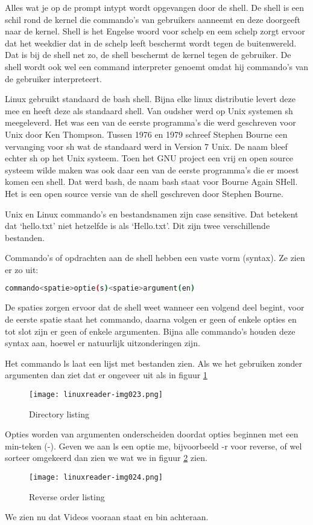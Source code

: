 Alles wat je op de prompt intypt wordt opgevangen door de shell. De shell is een schil rond de kernel die commando's van
gebruikers aanneemt en deze doorgeeft naar de kernel. Shell is het Engelse woord voor schelp en eem schelp zorgt ervoor
dat het weekdier dat in de schelp leeft beschermt wordt tegen de buitenwereld. Dat is bij de shell net zo, de shell
beschermt de kernel tegen de gebruiker. De shell wordt ook wel een command interpreter genoemt omdat hij commando's van
de gebruiker interpreteert.

Linux gebruikt standaard de bash shell. Bijna elke linux distributie levert deze mee en heeft deze als standaard shell.
Van oudsher werd op Unix systemen sh meegeleverd. Het was een van de eerste programma's die werd geschreven voor Unix
door Ken Thompson. Tussen 1976 en 1979 schreef Stephen Bourne een vervanging voor sh wat de standaard werd in Version 7
Unix. De naam bleef echter sh op het Unix systeem. Toen het GNU project een vrij en open source systeem wilde maken was
ook daar een van de eerste programma's die er moest komen een shell. Dat werd bash, de naam bash staat voor Bourne
Again SHell. Het is een open source versie van de shell geschreven door Stephen Bourne.

Unix en Linux commando's en bestandsnamen zijn case sensitive. Dat betekent dat `hello.txt' niet hetzelfde is als
`Hello.txt'. Dit zijn twee verschillende bestanden.

Commando's of opdrachten aan de shell hebben een vaste vorm (syntax). Ze zien er zo uit:

\begin{lstlisting}[language=bash]
commando<spatie>optie(s)<spatie>argument(en)
\end{lstlisting}

De spaties zorgen ervoor dat de shell weet wanneer een volgend deel begint, voor de eerste spatie staat het commando,
daarna volgen er geen of enkele opties en tot slot zijn er geen of enkele argumenten. Bijna alle commando's houden deze
syntax aan, hoewel er natuurlijk uitzonderingen zijn.

Het commando ls laat een lijst met bestanden zien. Als we het gebruiken zonder argumenten dan ziet dat er ongeveer uit als in figuur \ref{fig:lsDir}
\begin{figure}[h]
\texttt{[image: linuxreader-img023.png]}
\label{fig:lsDir}
	\caption{Directory listing}
\end{figure}

Opties worden van argumenten onderscheiden doordat opties beginnen met een min-teken (-). Geven we aan ls een optie me,
bijvoorbeeld -r voor reverse, of wel sorteer omgekeerd dan zien we wat we in figuur \ref{fig:lsRevDir} zien.
\begin{figure}
\texttt{[image: linuxreader-img024.png]}
	\label{fig:lsRevDir}
	\caption{Reverse order listing}
\end{figure}
We zien nu dat Videos vooraan staat en bin achteraan.

